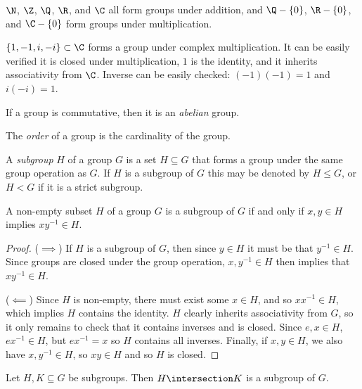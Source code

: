 \documentclass[12pt]{article}
\begin{document}
\begin{exmp}
    $\N$, $\Z$, $\Q$, $\R$, and $\C$ all form groups under addition, and $\Q - \{0\}$, $\R - \{0\}$, and $\C - \{0\}$ form groups under multiplication.
\end{exmp}

\begin{exmp}
    $\{1, -1, i, -i\} \subset \C$ forms a group under complex multiplication. It can be easily verified it is closed under multiplication, $1$ is the identity, and it inherits associativity from $\C$. Inverse can be easily checked: $(-1)(-1) = 1$ and $i(-i) = 1$.
\end{exmp}

\begin{defn}
    If a group is commutative, then it is an \emph{abelian} group.
\end{defn}

\begin{defn}
    The \emph{order} of a group is the cardinality of the group.
\end{defn}

\begin{defn}
    A \emph{subgroup} $H$ of a group $G$ is a set $H \subseteq G$ that forms a group under the same group operation as $G$. If $H$ is a subgroup of $G$ this may be denoted by $H \leqslant G$, or $H < G$ if it is a strict subgroup.
\end{defn}

\begin{thm}
    A non-empty subset $H$ of a group $G$ is a subgroup of $G$ if and only if $x, y \in H$ implies $xy^{-1} \in H$.
\end{thm}

\begin{proof}\proofbreak
    ($\implies$) If $H$ is a subgroup of $G$, then since $y \in H$ it must be that $y^{-1} \in H$. Since groups are closed under the group operation, $x, y^{-1} \in H$ then implies that $xy^{-1} \in H$.

    ($\impliedby$) Since $H$ is non-empty, there must exist some $x \in H$, and so $xx^{-1} \in H$, which implies $H$ contains the identity. $H$ clearly inherits associativity from $G$, so it only remains to check that it contains inverses and is closed. Since $e, x \in H$, $ex^{-1} \in H$, but $ex^{-1} = x$ so $H$ contains all inverses. Finally, if $x, y \in H$, we also have $x, y^{-1} \in H$, so $xy \in H$ and so $H$ is closed.
\end{proof}

\begin{thm}
    Let $H, K \subseteq G$ be subgroups. Then $H \intersection K$ is a subgroup of $G$.
\end{thm}
\end{document}
